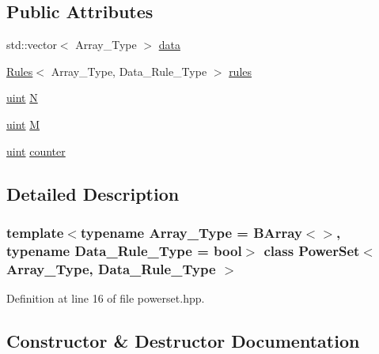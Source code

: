 \subsection*{Public Attributes}
\begin{DoxyCompactItemize}
\item 
std\+::vector$<$ Array\+\_\+\+Type $>$ \hyperlink{class_power_set_af456c157d157692ba5890c549c51af75}{data}
\item 
\hyperlink{class_rules}{Rules}$<$ Array\+\_\+\+Type, Data\+\_\+\+Rule\+\_\+\+Type $>$ \hyperlink{class_power_set_afde1de561c80f2d0064ba6267aef2edd}{rules}
\item 
\hyperlink{typedefs_8hpp_a91ad9478d81a7aaf2593e8d9c3d06a14}{uint} \hyperlink{class_power_set_ab3b65c1b9bce012f4aabe5acae093acd}{N}
\item 
\hyperlink{typedefs_8hpp_a91ad9478d81a7aaf2593e8d9c3d06a14}{uint} \hyperlink{class_power_set_a91d328d5ace1ed6a8587a66af905ae98}{M}
\item 
\hyperlink{typedefs_8hpp_a91ad9478d81a7aaf2593e8d9c3d06a14}{uint} \hyperlink{class_power_set_a90e8607cc6834f140d221b3448593ab9}{counter}
\end{DoxyCompactItemize}


\subsection{Detailed Description}
\subsubsection*{template$<$typename Array\+\_\+\+Type = B\+Array$<$$>$, typename Data\+\_\+\+Rule\+\_\+\+Type = bool$>$\newline
class Power\+Set$<$ Array\+\_\+\+Type, Data\+\_\+\+Rule\+\_\+\+Type $>$}



Definition at line 16 of file powerset.\+hpp.



\subsection{Constructor \& Destructor Documentation}
\mbox{\label{class_power_set_a095815ccc44c88e0da73d92c6b5cf5f3}} 
